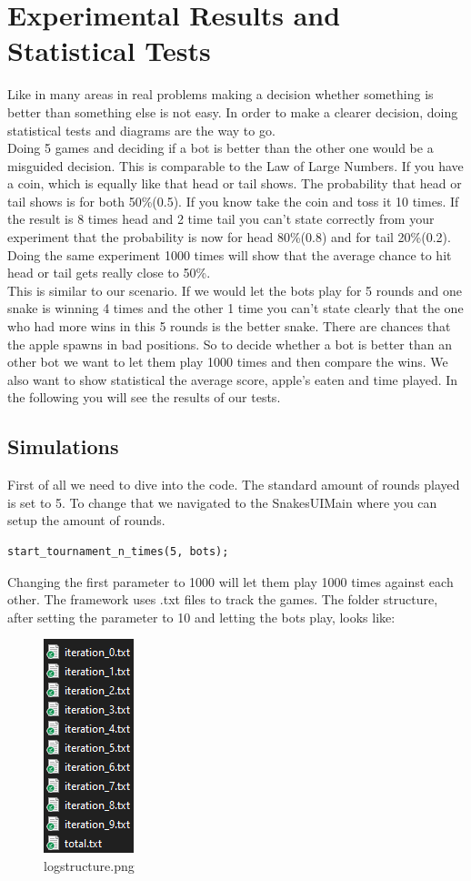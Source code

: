 \documentclass[a4paper,12pt]{article}
\begin{document}
\section{Experimental Results and Statistical Tests}
Like in many areas in real problems making a decision whether something is better than something else is not easy. In order to make a clearer decision, doing statistical tests and diagrams are the way to go.\\
Doing 5 games and deciding if a bot is better than the other one would be a misguided decision. This is comparable to the Law of Large Numbers. If you have a coin, which is equally like that head or tail shows. The probability that head or tail shows is for both 50\%(0.5). If you know take the coin and toss it 10 times. If the result is 8 times head and 2 time tail you can't state correctly from your experiment that the probability is now for head 80\%(0.8) and for tail 20\%(0.2). Doing the same experiment 1000 times will show that the average chance to hit head or tail gets really close to 50\%.\\
This is similar to our scenario. If we would let the bots play for 5 rounds and one snake is winning 4 times and the other 1 time you can't state clearly that the one who had more wins in this 5 rounds is the better snake. There are chances that the apple spawns in bad positions. So to decide whether a bot is better than an other bot we want to let them play 1000 times and then compare the wins. We also want to show statistical the average score, apple's eaten and time played. In the following you will see the results of our tests.\newpage
\subsection{Simulations}
First of all we need to dive into the code. The standard amount of rounds played is set to 5. To change that we navigated to the SnakesUIMain where you can setup the amount of rounds.
\begin{verbatim}
start_tournament_n_times(5, bots);
\end{verbatim}
Changing the first parameter to 1000 will let them play 1000 times against each other. The framework uses .txt files to track the games. The folder structure, after setting the parameter to 10 and letting the bots play, looks like:
\begin{figure}[H]
    \centering
    \includegraphics[scale=0.8]{logs_structure}
\caption{logstructure.png}
    \label{fig:logs_structure.png}
\end{figure}
\end{document}
